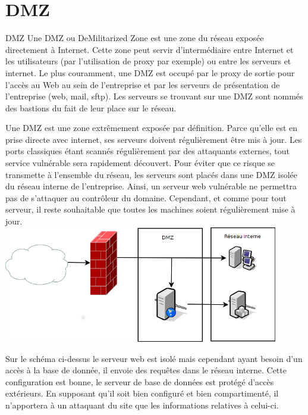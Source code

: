 \documentclass[twoside,a4paper,12pt,titlepage]{book}
\begin{document}
\section{DMZ\label{DMZ}}
\begin{Define}{\gls{DMZ}}
	Une \gls{DMZ} ou DeMilitarized Zone est une zone du réseau exposée directement à Internet. Cette zone peut servir d'intermédiaire entre Internet et les utilisateurs (par l'utilisation de proxy par exemple) ou entre les serveurs et internet. Le plus couramment, une DMZ est occupé par le proxy de sortie pour l'accès au Web au sein de l'entreprise et par les serveurs de présentation de l'entreprise (web, mail, sftp). Les serveurs se trouvant sur une DMZ sont nommés des bastions du fait de leur place sur le réseau.
\end{Define}
Une DMZ est une zone extrêmement exposée par définition. Parce qu'elle est en prise directe avec internet, ses serveurs doivent régulièrement être mis à jour. Les ports classiques étant scannés régulièrement par des attaquants externes, tout service vulnérable sera rapidement découvert. Pour éviter que ce risque se transmette à l'ensemble du réseau, les serveurs sont placés dans une DMZ isolée du réseau interne de l'entreprise. Ainsi, un serveur web vulnérable ne permettra pas de s'attaquer au contrôleur du domaine. Cependant, et comme pour tout serveur, il reste souhaitable que toutes les machines soient régulièrement mise à jour.\\

\includegraphics[width=0.9\textwidth]{DMZ_1.png}

Sur le schéma ci-dessus le serveur web est isolé mais cependant ayant besoin d'un accès à la base de donnée, il envoie des requêtes dans le réseau interne. Cette configuration est bonne, le serveur de base de données est protégé d'accès extérieurs. En supposant qu'il soit bien configuré et bien compartimenté, il n'apportera à un attaquant du site que les informations relatives à celui-ci.\\
\end{document}

